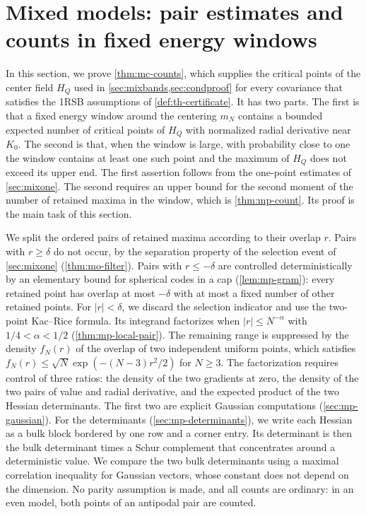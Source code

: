 \chapter{Mixed models: pair estimates and counts in fixed energy windows}\label{sec:mixpair}

In this section, we prove \cref{thm:mc-counts}, which supplies the critical points of the center field $H_Q$ used in \cref{sec:mixbands,sec:condproof} for every covariance that satisfies the 1RSB assumptions of \cref{def:th-certificate}. It has two parts. The first is that a fixed energy window around the centering $m_N$ contains a bounded expected number of critical points of $H_Q$ with normalized radial derivative near $K_0$. The second is that, when the window is large, with probability close to one the window contains at least one such point and the maximum of $H_Q$ does not exceed its upper end. The first assertion follows from the one-point estimates of \cref{sec:mixone}. The second requires an upper bound for the second moment of the number of retained maxima in the window, which is \cref{thm:mp-count}. Its proof is the main task of this section.

We split the ordered pairs of retained maxima according to their overlap $r$. Pairs with $r\ge\delta$ do not occur, by the separation property of the selection event of \cref{sec:mixone} (\cref{thm:mo-filter}). Pairs with $r\le-\delta$ are controlled deterministically by an elementary bound for spherical codes in a cap (\cref{lem:mp-gram}): every retained point has overlap at most $-\delta$ with at most a fixed number of other retained points. For $|r|<\delta$, we discard the selection indicator and use the two-point Kac--Rice formula. Its integrand factorizes when $|r|\le N^{-\alpha}$ with $1/4<\alpha<1/2$ (\cref{thm:mp-local-pair}). The remaining range is suppressed by the density $f_N(r)$ of the overlap of two independent uniform points, which satisfies $f_N(r)\le\sqrt N\exp(-(N-3)r^2/2)$ for $N\ge3$. The factorization requires control of three ratios: the density of the two gradients at zero, the density of the two pairs of value and radial derivative, and the expected product of the two Hessian determinants. The first two are explicit Gaussian computations (\cref{sec:mp-gaussian}). For the determinants (\cref{sec:mp-determinants}), we write each Hessian as a bulk block bordered by one row and a corner entry. Its determinant is then the bulk determinant times a Schur complement that concentrates around a deterministic value. We compare the two bulk determinants using a maximal correlation inequality for Gaussian vectors, whose constant does not depend on the dimension. No parity assumption is made, and all counts are ordinary: in an even model, both points of an antipodal pair are counted.

